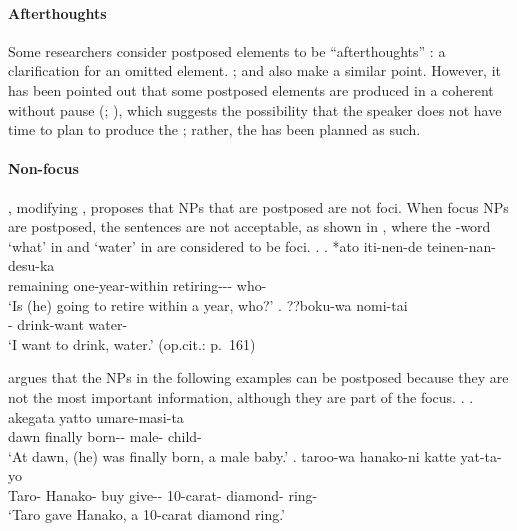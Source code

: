 \paragraph{Afterthoughts}

Some researchers consider postposed elements to be ``afterthoughts'' \cite[259]{shibatani90}:
a clarification for an omitted element.
; and  also make a similar point.
However,
it has been pointed out that
some postposed elements are produced in a coherent  without pause (; ),
which suggests the possibility that
the speaker does not have time to plan to produce the ;
rather, the  has been planned as such.




\paragraph{Non-focus}

,
modifying ,
proposes that NPs that are postposed are not foci.
When focus NPs are postposed,
the sentences are not acceptable,
as shown in \Next,
where the -word  `what' in \Next[a] and
 `water' in \Next[b] are considered to be foci.
%
\ex.
 \ag. *ato iti-nen-de teinen-nan-desu-ka  \\
      remaining one-year-within retiring--- who- \\
      `Is (he) going to retire within a year, who?'
      \hfill{\cite[160]{takami95b}}      
 \bg. ??boku-wa nomi-tai  \\
      - drink-want water- \\
      `I want to drink, water.'
      \hfill{(op.cit.: p.~161)}

 argues that
the NPs in the following examples can be postposed because
they are not the most important information,
although they are part of the focus.
%
\ex.
 \ag. akegata yatto umare-masi-ta   \\
      dawn finally born-- male- child- \\
      `At dawn, (he) was finally born, a male baby.'
 \bg. taroo-wa hanako-ni katte yat-ta-yo    \\
      Taro- Hanako- buy give-- 10-carat- diamond- ring- \\
      `Taro gave Hanako, a 10-carat diamond ring.'
      \hfill{\cite[236]{takami95a}}

